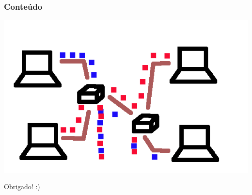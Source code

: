 \documentclass{beamer}
\begin{document}
\begin{frame}
	\frametitle{Conteúdo}
	\begin{center}
	\includegraphics[scale=0.3]{simulator2.png}
	\end{center}
	\begin{center}
	Obrigado! :)
	\end{center}

\end{frame}
\end{document}
